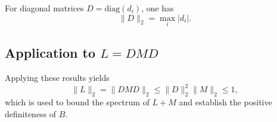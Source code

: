 \documentclass[%
 reprint,
 amsmath,amssymb,
 aps,
twocolumn
]{revtex4-2}
\begin{document}
For diagonal matrices $D = \mathrm{diag}(d_i)$, one has
\begin{equation}
\|D\|_2 = \max_i |d_i|.
\end{equation}

\subsection{Application to $L = DMD$}

Applying these results yields
\begin{equation}
\|L\|_2 = \|DMD\|_2 \le \|D\|_2^2 \|M\|_2 \le 1,
\end{equation}
which is used to bound the spectrum of $L+M$ and establish the positive definiteness of $B$.
\end{document}
